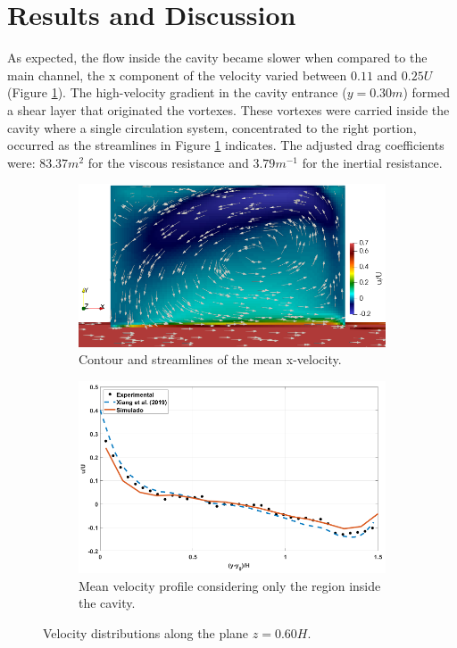 \section{Results and Discussion}
As expected, the flow inside the cavity became slower when compared to the main channel, the x component of the velocity varied between $0.11$ and $0.25U$ (Figure \ref{fig:art2:velCont}). The high-velocity gradient in the cavity entrance ($y=0.30m$) formed a shear layer that originated the vortexes. These vortexes were carried inside the cavity where a single circulation system, concentrated to the right portion, occurred as the streamlines in Figure \ref{fig:art2:velCont} indicates. The adjusted drag coefficients were: $83.37m^2$ for the viscous resistance and $3.79m^{-1}$ for the inertial resistance.

\begin{figure}[!ht]
\centering
\begin{subfigure}{0.49\textwidth}
  \centering
  \includegraphics[width=0.9\linewidth]{../images/art2/imgHyd2.png}
  \caption[width=0.9\linewidth]{Contour and streamlines of the mean x-velocity.}
  \label{fig:art2:velCont}
\end{subfigure}%
\begin{subfigure}{.49\textwidth}
  \centering
  \includegraphics[width=0.9\linewidth]{../images/art2/imgHyd3.png}
  \caption[width=0.9\linewidth]{Mean velocity profile considering only the region inside the cavity.}
  \label{fig:art2:velProf}
\end{subfigure}
\caption{Velocity distributions along the plane $z=0.60H$.}
\label{fig:art2:velz06H}
\end{figure}
